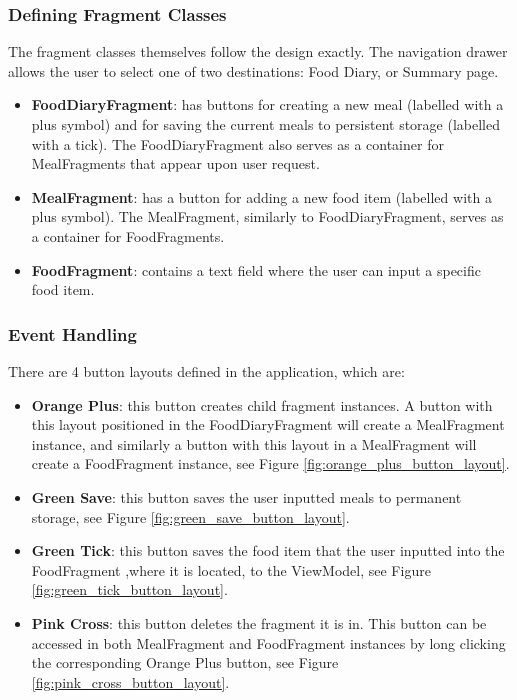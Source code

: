\documentclass{article}
\begin{document}
\subsubsection{Defining Fragment Classes}
The fragment classes themselves follow the design exactly. The navigation drawer allows the user to select one of two destinations: Food Diary, or Summary page. 

\begin{itemize}
    \item \textbf{FoodDiaryFragment}: has buttons for creating a new meal (labelled with a plus symbol) and for saving the current meals to persistent storage (labelled with a tick). The FoodDiaryFragment also serves as a container for MealFragments that appear upon user request. 
    \item \textbf{MealFragment}: has a button for adding a new food item (labelled with a plus symbol). The MealFragment, similarly to FoodDiaryFragment, serves as a container for FoodFragments. 
    \item \textbf{FoodFragment}: contains a text field where the user can input a specific food item.
\end{itemize}

\newpage
\subsubsection{Event Handling}
There are 4 button layouts defined in the application, which are: 

\bigskip
\begin{itemize}
    \item \textbf{Orange Plus}: this button creates child fragment instances. A button with this layout positioned in the FoodDiaryFragment will create a MealFragment instance, and similarly a button with this layout in a MealFragment will create a FoodFragment instance, see Figure \ref{fig:orange_plus_button_layout}.
    \item \textbf{Green Save}: this button saves the user inputted meals to permanent storage, see Figure \ref{fig:green_save_button_layout}.
    \item \textbf{Green Tick}: this button saves the food item that the user inputted into the FoodFragment ,where it is located, to the ViewModel, see Figure \ref{fig:green_tick_button_layout}.
    \item \textbf{Pink Cross}: this button deletes the fragment it is in. This button can be accessed in both MealFragment and FoodFragment instances by long clicking the corresponding Orange Plus button, see Figure \ref{fig:pink_cross_button_layout}.
\end{itemize}
\end{document}
